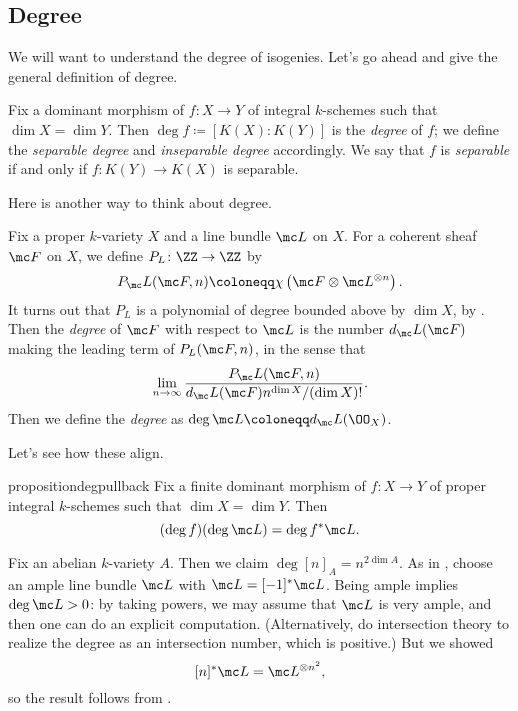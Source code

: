 \documentclass[../notes.tex]{subfiles}
\begin{document}
\subsection{Degree}
We will want to understand the degree of isogenies. Let's go ahead and give the general definition of degree.
\begin{definition}[degree]
	Fix a dominant morphism of $f\colon X\to Y$ of integral $k$-schemes such that $\dim X=\dim Y$. Then $\deg f\coloneqq[K(X):K(Y)]$ is the \textit{degree} of $f$; we define the \textit{separable degree} and \textit{inseparable degree} accordingly. We say that $f$ is \textit{separable} if and only if $f\colon K(Y)\to K(X)$ is separable.
\end{definition}
Here is another way to think about degree.
\begin{definition}[degree]
	Fix a proper $k$-variety $X$ and a line bundle $\mc L$ on $X$. For a coherent sheaf $\mc F$ on $X$, we define $P_L\colon\ZZ\to\ZZ$ by
	\[P_\mc L(\mc F,n)\coloneqq\chi\left(\mc F\otimes\mc L^{\otimes n}\right).\]
	It turns out that $P_L$ is a polynomial of degree bounded above by $\dim X$, by \cite[Theorem~19.6.1]{rising-sea}. Then the \textit{degree} of $\mc F$ with respect to $\mc L$ is the number $d_\mc L(\mc F)$ making the leading term of $P_L(\mc F,n)$, in the sense that
	\[\lim_{n\to\infty}\frac{P_\mc L(\mc F,n)}{d_\mc L(\mc F)n^{\dim X}/(\dim X)!}.\]
	Then we define the \textit{degree} as $\deg\mc L\coloneqq d_\mc L(\OO_X)$.
\end{definition}
Let's see how these align.
\begin{restatable}{proposition}{degpullback} \label{prop:deg-of-pullback}
	Fix a finite dominant morphism of $f\colon X\to Y$ of proper integral $k$-schemes such that $\dim X=\dim Y$. Then
	\[(\deg f)(\deg\mc L)=\deg f^*\mc L.\]
\end{restatable}
\begin{example}
	Fix an abelian $k$-variety $A$. Then we claim $\deg[n]_A=n^{2\dim A}$. As in , choose an ample line bundle $\mc L$ with $\mc L=[-1]^*\mc L$. Being ample implies $\deg\mc L>0$: by taking powers, we may assume that $\mc L$ is very ample, and then one can do an explicit computation. (Alternatively, do intersection theory to realize the degree as an intersection number, which is positive.) But we showed
	\[[n]^*\mc L=\mc L^{\otimes n^2},\]
	so the result follows from .
\end{example}
\end{document}
